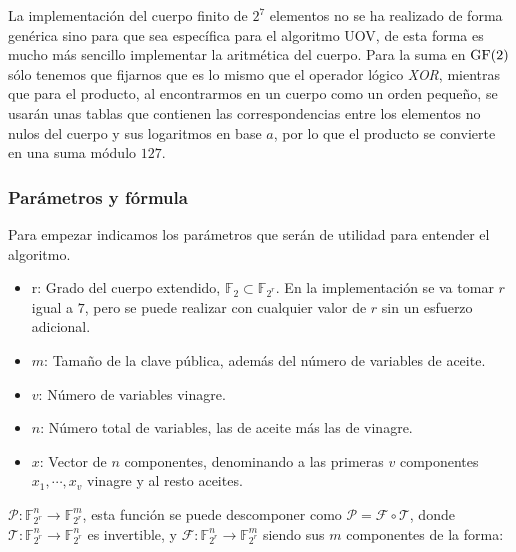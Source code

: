 La implementación del cuerpo finito de $2^7$ elementos no se ha realizado de forma genérica sino para que sea específica para el algoritmo UOV, de esta forma es mucho más sencillo implementar la aritmética del cuerpo. Para la suma en $\operatorname{GF}(2)$ sólo tenemos que fijarnos que es lo mismo que el operador lógico \textit{XOR}, mientras que para el producto, al encontrarmos en un cuerpo como un orden pequeño, se usarán unas tablas que contienen las correspondencias entre los elementos no nulos del cuerpo y sus logaritmos en base $a$, por lo que el producto se convierte en una suma módulo $127$.\\




\subsubsection{Parámetros y fórmula}
Para empezar indicamos los parámetros que serán de utilidad para entender el algoritmo.
\begin{itemize}
	\item r: Grado del cuerpo extendido, $\mathds{F}_2 \subset \mathds{F}_{2^r}$. En la implementación se va tomar $r$ igual a $7$, pero se puede realizar con cualquier valor de $r$ sin un esfuerzo adicional.
	\item $m$: Tamaño de la clave pública, además del número de variables de aceite.
	\item $v$: Número de variables vinagre.
	\item $n$: Número total de variables, las de aceite más las de vinagre.
	\item $x$: Vector de $n$ componentes, denominando a las primeras $v$ componentes  $x_1, \dotsb, x_v$ vinagre y al resto aceites.
	
	
\end{itemize}

$\mathcal{P}: \mathds{F}_{2^r}^n \rightarrow \mathds{F}_{2^r}^m$, esta función se puede descomponer como $\mathcal{P} = \mathcal{F} \circ \mathcal{T}$, donde $\mathcal{T}: \mathds{F}_{2^r}^n \rightarrow \mathds{F}_{2^r}^n$ es invertible, y $\mathcal{F}: \mathds{F}_{2^r}^n \rightarrow \mathds{F}_{2^r}^m$ siendo sus $m$ componentes de la forma:


